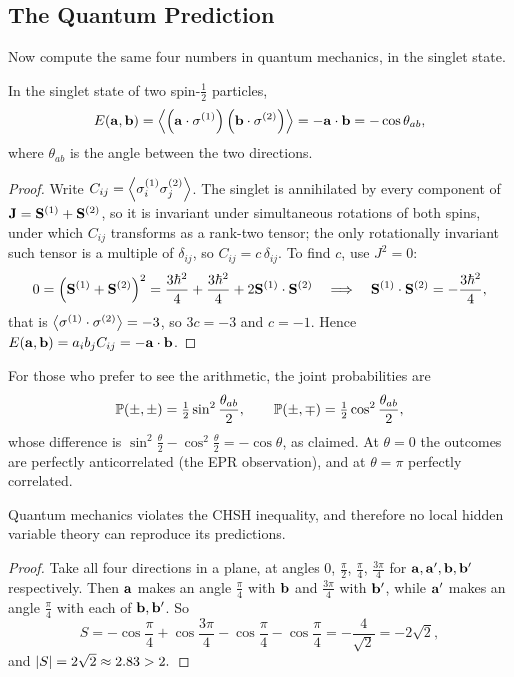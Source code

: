\documentclass[a4paper]{scrartcl}
\newcommand{\half}{\tfrac{1}{2}}
\begin{document}
\subsection{The Quantum Prediction}

Now compute the same four numbers in quantum mechanics, in the singlet state.

\begin{proposition}
    In the singlet state of two spin-$\half$ particles,
    $$
    E(\mathbf{a}, \mathbf{b}) = \expval{\left( \mathbf{a} \cdot \mathbf{\sigma}^{(1)}\right)\left( \mathbf{b} \cdot \mathbf{\sigma}^{(2)}\right)} = - \mathbf{a} \cdot \mathbf{b} = -\cos\theta_{ab},
    $$
    where $\theta_{ab}$ is the angle between the two directions.
\end{proposition}
\begin{proof}
    Write $C_{ij} = \expval{\sigma_i^{(1)}\sigma_j^{(2)}}$. The singlet is annihilated by every component of $\mathbf{J} = \mathbf{S}^{(1)} + \mathbf{S}^{(2)}$, so it is invariant under simultaneous rotations of both spins, under which $C_{ij}$ transforms as a rank-two tensor; the only rotationally invariant such tensor is a multiple of $\delta_{ij}$, so $C_{ij} = c\,\delta_{ij}$. To find $c$, use $J^2 = 0$:
    $$
    0 = \left(\mathbf{S}^{(1)}+\mathbf{S}^{(2)}\right)^2 = \frac{3\hbar^2}{4}+\frac{3\hbar^2}{4} + 2\mathbf{S}^{(1)}\cdot\mathbf{S}^{(2)} \quad\Longrightarrow\quad \mathbf{S}^{(1)}\cdot\mathbf{S}^{(2)} = -\frac{3\hbar^2}{4},
    $$
    that is $\expval{\mathbf{\sigma}^{(1)}\cdot\mathbf{\sigma}^{(2)}} = -3$, so $3c = -3$ and $c = -1$. Hence $E(\mathbf{a},\mathbf{b}) = a_ib_jC_{ij} = -\mathbf{a} \cdot \mathbf{b}$.
\end{proof}

For those who prefer to see the arithmetic, the joint probabilities are
$$
\PP(\pm,\pm) = \half\sin^2\frac{\theta_{ab}}{2}, \qquad \PP(\pm,\mp) = \half\cos^2\frac{\theta_{ab}}{2},
$$
whose difference is $\sin^2\frac\theta2 - \cos^2\frac\theta2 = -\cos\theta$, as claimed. At $\theta = 0$ the outcomes are perfectly anticorrelated (the EPR observation), and at $\theta = \pi$ perfectly correlated.

\begin{corollary}
    Quantum mechanics violates the CHSH inequality, and therefore no local hidden variable theory can reproduce its predictions.
\end{corollary}
\begin{proof}
    Take all four directions in a plane, at angles $0$, $\frac\pi2$, $\frac\pi4$, $\frac{3\pi}{4}$ for $\mathbf{a}, \mathbf{a}', \mathbf{b}, \mathbf{b}'$ respectively. Then $\mathbf{a}$ makes an angle $\frac\pi4$ with $\mathbf{b}$ and $\frac{3\pi}{4}$ with $\mathbf{b}'$, while $\mathbf{a}'$ makes an angle $\frac\pi4$ with each of $\mathbf{b}, \mathbf{b}'$. So
    $$
    S = -\cos\frac\pi4 + \cos\frac{3\pi}{4} - \cos\frac\pi4 - \cos\frac\pi4 = -\frac{4}{\sqrt2} = -2\sqrt2,
    $$
    and $\lvert S\rvert = 2\sqrt2 \approx 2.83 > 2. \qedhere$
\end{proof}
\end{document}
